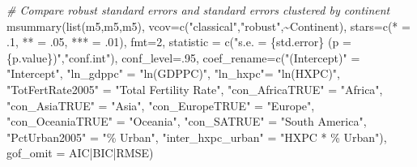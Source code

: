 \documentclass[
]{article}
\newenvironment{Shaded}{\begin{snugshade}}{\end{snugshade}}
\newcommand{\AttributeTok}[1]{\textcolor[rgb]{0.77,0.63,0.00}{#1}}
\newcommand{\CommentTok}[1]{\textcolor[rgb]{0.56,0.35,0.01}{\textit{#1}}}
\newcommand{\DecValTok}[1]{\textcolor[rgb]{0.00,0.00,0.81}{#1}}
\newcommand{\FunctionTok}[1]{\textcolor[rgb]{0.00,0.00,0.00}{#1}}
\newcommand{\NormalTok}[1]{#1}
\newcommand{\OtherTok}[1]{\textcolor[rgb]{0.56,0.35,0.01}{#1}}
\newcommand{\SpecialCharTok}[1]{\textcolor[rgb]{0.00,0.00,0.00}{#1}}
\newcommand{\StringTok}[1]{\textcolor[rgb]{0.31,0.60,0.02}{#1}}
\begin{document}
\begin{Shaded}
\begin{Highlighting}[]
\CommentTok{\# Compare robust standard errors and standard errors clustered by continent}
\FunctionTok{msummary}\NormalTok{(}\FunctionTok{list}\NormalTok{(m5,m5,m5),}
         \AttributeTok{vcov=}\FunctionTok{c}\NormalTok{(}\StringTok{"classical"}\NormalTok{,}\StringTok{"robust"}\NormalTok{,}\SpecialCharTok{\textasciitilde{}}\NormalTok{Continent),}
         \AttributeTok{stars=}\FunctionTok{c}\NormalTok{(}\StringTok{\textquotesingle{}*\textquotesingle{}} \OtherTok{=}\NormalTok{ .}\DecValTok{1}\NormalTok{, }\StringTok{\textquotesingle{}**\textquotesingle{}} \OtherTok{=}\NormalTok{ .}\DecValTok{05}\NormalTok{, }\StringTok{\textquotesingle{}***\textquotesingle{}} \OtherTok{=}\NormalTok{ .}\DecValTok{01}\NormalTok{),}
         \AttributeTok{fmt=}\DecValTok{2}\NormalTok{,}
         \AttributeTok{statistic =} \FunctionTok{c}\NormalTok{(}\StringTok{"s.e. = \{std.error\} (p = \{p.value\})"}\NormalTok{,}\StringTok{"conf.int"}\NormalTok{),}
         \AttributeTok{conf\_level=}\NormalTok{.}\DecValTok{95}\NormalTok{,}
         \AttributeTok{coef\_rename=}\FunctionTok{c}\NormalTok{(}\StringTok{"(Intercept)"} \OtherTok{=} \StringTok{"Intercept"}\NormalTok{, }\StringTok{"ln\_gdppc"} \OtherTok{=} \StringTok{"ln(GDPPC)"}\NormalTok{, }\StringTok{"ln\_hxpc"}\OtherTok{=} \StringTok{"ln(HXPC)"}\NormalTok{, }
                       \StringTok{"TotFertRate2005"} \OtherTok{=} \StringTok{"Total Fertility Rate"}\NormalTok{,}
                       \StringTok{"con\_AfricaTRUE"} \OtherTok{=} \StringTok{"Africa"}\NormalTok{, }\StringTok{"con\_AsiaTRUE"} \OtherTok{=} \StringTok{"Asia"}\NormalTok{, }\StringTok{"con\_EuropeTRUE"} \OtherTok{=} \StringTok{"Europe"}\NormalTok{,}
                       \StringTok{"con\_OceaniaTRUE"} \OtherTok{=} \StringTok{"Oceania"}\NormalTok{, }\StringTok{"con\_SATRUE"} \OtherTok{=} \StringTok{"South America"}\NormalTok{,}
                       \StringTok{"PctUrban2005"} \OtherTok{=} \StringTok{"\% Urban"}\NormalTok{, }\StringTok{"inter\_hxpc\_urban"} \OtherTok{=} \StringTok{"HXPC * \% Urban"}\NormalTok{),}
         \AttributeTok{gof\_omit =} \StringTok{\textquotesingle{}AIC|BIC|RMSE\textquotesingle{}}\NormalTok{) }
\end{Highlighting}
\end{Shaded}
\end{document}
